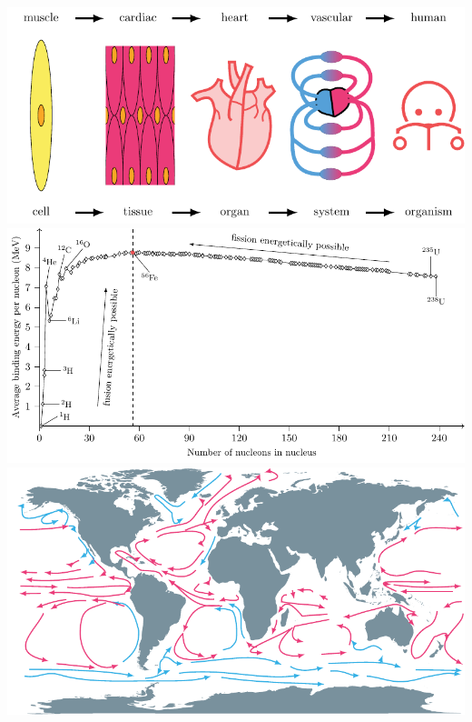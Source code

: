     \clearpage
    \begin{center}
        \includegraphics[width=0.85\linewidth]{./TikZimages/TikZ10.pdf}\\
        \vfill
        \includegraphics[width=0.85\linewidth]{./TikZimages/TikZ12.pdf}\\
        \vfill
        \includegraphics[width=0.85\linewidth]{./TikZimages/TikZ11.pdf}
    \end{center}


